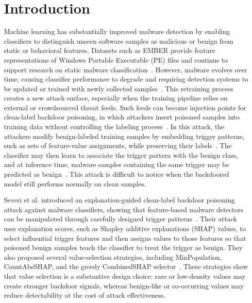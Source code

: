 \section{Introduction}
Machine learning has substantially improved malware detection by enabling classifiers to distinguish unseen software samples as malicious or benign from static or behavioral features.
Datasets such as EMBER provide feature representations of Windows Portable Executable (PE) files and continue to support research on static malware classification~\cite{ember2018}.
However, malware evolves over time, causing classifier performance to degrade and requiring detection systems to be updated or trained with newly collected samples~\cite{concept_drift}.
This retraining process creates a new attack surface, especially when the training pipeline relies on external or crowdsourced threat feeds.
Such feeds can become injection points for clean-label backdoor poisoning, in which attackers insert poisoned samples into training data without controlling the labeling process~\cite{severi}.
In this attack, the attackers modify benign-labeled training samples by embedding trigger patterns, such as sets of feature-value assignments, while preserving their labels~\cite{severi,gu_badnets,pmsb}.
The classifier may then learn to associate the trigger pattern with the benign class, and at inference time, malware samples containing the same trigger may be predicted as benign~\cite{severi,pmsb}.
This attack is difficult to notice when the backdoored model still performs normally on clean samples.

Severi et al. introduced an explanation-guided clean-label backdoor poisoning attack against malware classifiers, showing that feature-based malware detectors can be manipulated through carefully designed trigger patterns~\cite{severi}.
Their attack uses explanation scores, such as Shapley additive explanations (SHAP) values, to select influential trigger features and then assigns values to those features so that poisoned benign samples teach the classifier to treat the trigger as benign.
They also proposed several value-selection strategies, including MinPopulation, CountAbsSHAP, and the greedy CombinedSHAP selector~\cite{severi}.
These strategies show that value selection is a substantive design choice: rare or low-density values may create stronger backdoor signals, whereas benign-like or co-occurring values may reduce detectability at the cost of attack effectiveness.

